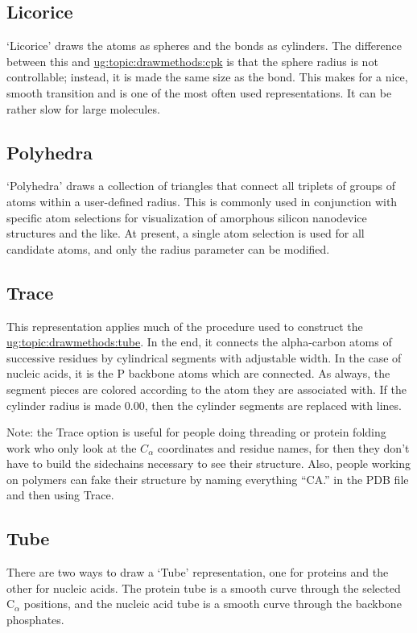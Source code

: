 \subsection{Licorice}
`Licorice' draws the atoms as spheres and the bonds as cylinders.  The
difference between this and 
\hyperref{`CPK'}{`CPK' [\S~}{]}{ug:topic:drawmethods:cpk} is that 
the sphere radius is not controllable; instead, it is made the same 
size as the bond.  This makes for a nice, smooth transition and is one 
of the most often used representations.
It can be rather slow for large molecules.


\subsection{Polyhedra}
`Polyhedra' draws a collection of triangles that connect all triplets of
groups of atoms within a user-defined radius.  This is commonly used in
conjunction with specific atom selections for visualization of 
amorphous silicon nanodevice structures and the like.  At present, a
single atom selection is used for all candidate atoms, and only the
radius parameter can be modified.


\subsection{Trace}
\label{ug:topic:drawmethods:trace}
This representation applies much of the procedure used to construct the
\hyperref{`Tube'}{`Tube' [\S~}{]}{ug:topic:drawmethods:tube}.  In the end, it
connects the alpha-carbon atoms of successive residues by cylindrical
segments with adjustable width.  In the case of nucleic acids, it is the P
backbone atoms which are connected.  As always, the segment pieces are
colored according to the atom they are associated with.  If the cylinder
radius is made 0.00, then the cylinder segments are replaced with lines.

Note: the Trace option is useful for people doing threading or protein
folding work who only look at the $C_\alpha$ coordinates and residue
names, for then they don't have to build the sidechains necessary to
see their structure.  Also, people working on polymers can fake their
structure by naming everything ``CA.'' in the PDB file and then using
Trace.


\subsection{Tube}
\label{ug:topic:drawmethods:tube}
There are two ways to draw a `Tube' representation, one for proteins and
the other for nucleic acids.  The protein tube is a smooth curve through the
selected C${}_\alpha$ positions, and the nucleic acid tube is a smooth curve
through the backbone phosphates.

